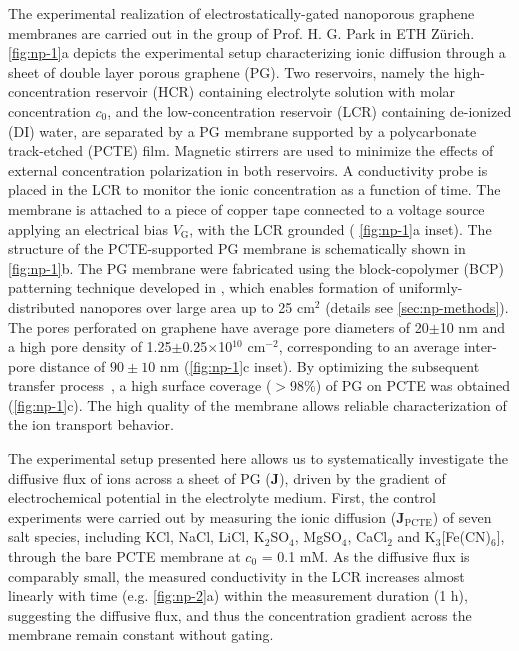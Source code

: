 The experimental realization of electrostatically-gated nanoporous
graphene membranes are carried out in the group of Prof. H. G. Park
 in ETH Zürich. 
%
 \autoref{fig:np-1}a depicts the experimental setup characterizing
ionic diffusion through a sheet of double layer porous graphene
(PG).
%
Two reservoirs, namely the high-concentration reservoir (HCR)
containing electrolyte solution with molar concentration $c_0$, and
the low-concentration reservoir (LCR) containing de-ionized (DI)
water, are separated by a PG membrane supported by a polycarbonate
track-etched (PCTE) film.
%
Magnetic stirrers are used to minimize the effects of external
concentration polarization in both reservoirs.
%
A conductivity
probe is placed in the LCR to monitor the ionic concentration as a
function of time. The membrane is attached to a piece of copper tape
connected to a voltage source applying an electrical bias
$V_{\mathrm{G}}$, with the LCR grounded ( \autoref{fig:np-1}a
inset).
%
The structure of the PCTE-supported PG membrane is schematically shown
in \autoref{fig:np-1}b. The PG membrane were fabricated using the
block-copolymer (BCP) patterning technique developed in
\cite{Choi_2018_wafer_scale_gr}, which enables formation of
uniformly-distributed nanopores over large area up to 25 cm$^{2}$
(details see \autoref{sec:np-methods}).
%
The pores perforated on graphene have average pore diameters of
20$\pm$10 nm and a high pore density of 1.25$\pm$0.25$\times$10$^{10}$
cm$^{-2}$, corresponding to an average inter-pore distance of
$90\pm10$ nm  (\autoref{fig:np-1}c inset).
%
By optimizing the subsequent transfer
process~\cite{Choi_2018_wafer_scale_gr}, a high surface coverage
($>$98\%) of PG on PCTE was obtained (\autoref{fig:np-1}c).
The high quality of the membrane allows
reliable characterization of the ion transport behavior.
%


The experimental setup presented
here allows us to systematically investigate the diffusive flux of
ions across a sheet of PG ($\symbf{J}$), driven by the gradient of
electrochemical potential in the electrolyte medium.
%
First, the control experiments were carried out by measuring the ionic
diffusion ($\mathbf{J}_{\mathrm{PCTE}}$) of seven salt species,
including KCl, NaCl, LiCl, K$_{2}$SO$_{4}$, MgSO$_{4}$, CaCl$_{2}$ and
K$_{3}$[Fe(CN)$_{6}$], through the bare PCTE membrane at $c_{0}$ = 0.1
mM.
%
As the diffusive flux is comparably small, the measured conductivity
in the LCR increases almost linearly with time (e.g.
\autoref{fig:np-2}a) within the measurement duration (1 h), suggesting
the diffusive flux, and thus the concentration gradient across the
membrane remain constant without gating.
%


